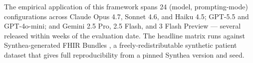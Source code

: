 The empirical application of this framework spans 24 (model,
prompting-mode) configurations across Claude Opus 4.7, Sonnet 4.6,
and Haiku 4.5; GPT-5.5 and GPT-4o-mini; and Gemini 2.5 Pro, 2.5
Flash, and 3 Flash Preview --- several released within weeks of the
evaluation date. The headline matrix runs against Synthea-generated
FHIR Bundles \autocite{Walonoski2018}, a freely-redistributable
synthetic patient dataset that gives full reproducibility from a
pinned Synthea version and seed.
